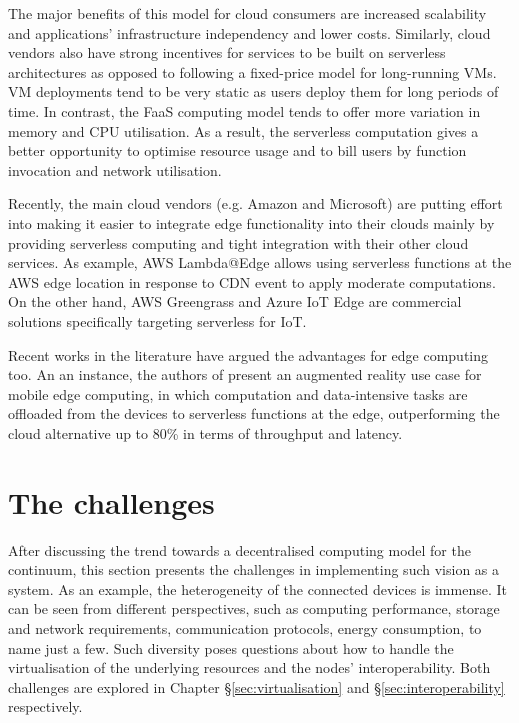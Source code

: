 The major benefits of this model for cloud consumers are increased scalability and applications' infrastructure independency and lower costs. Similarly, cloud vendors also have strong incentives for services to be built on serverless architectures as opposed to following a fixed-price model for long-running VMs. VM deployments tend to be very static as users deploy them for long periods of time. In contrast, the FaaS computing model tends to offer more variation in memory and CPU utilisation. As a result, the serverless computation gives a better opportunity to optimise resource usage and to bill users by function invocation and network utilisation.

Recently, the main cloud vendors (e.g. Amazon and Microsoft) are putting effort into making it easier to integrate edge functionality into their clouds mainly by providing serverless computing and tight integration with their other cloud services. As example, AWS Lambda@Edge \cite{aws-lambda-edge} allows using serverless functions at the AWS edge location in response to CDN event to apply moderate computations. On the other hand, AWS Greengrass \cite{aws-greengrass} and Azure IoT Edge \cite{azure-iot-edge} are commercial solutions specifically targeting serverless for IoT.

Recent works in the literature have argued the advantages for edge computing too. An an instance, the authors of \cite{serverless-mec} present an augmented reality use case for mobile edge computing, in which computation and data-intensive tasks are offloaded from the devices to serverless functions at the edge, outperforming the cloud alternative up to 80\% in terms of throughput and latency.

\section{The challenges}
\label{challenges}

After discussing the trend towards a decentralised computing model for the continuum, this section presents the challenges in implementing such vision as a system. As an example, the heterogeneity of the connected devices is immense. It can be seen from different perspectives, such as computing performance, storage and network requirements, communication protocols, energy consumption, to name just a few. Such diversity poses questions about how to handle the virtualisation of the underlying resources and the nodes' interoperability. Both challenges are explored in Chapter §\ref{sec:virtualisation} and §\ref{sec:interoperability} respectively.

